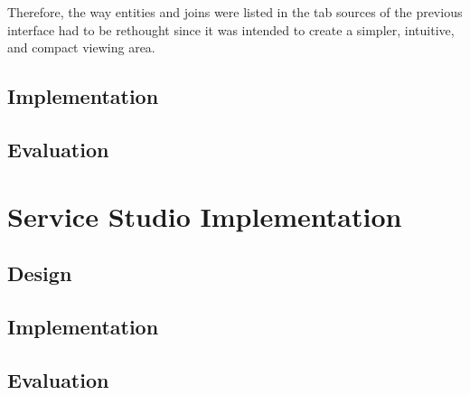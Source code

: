 Therefore, the way entities and joins were listed in the tab sources of the previous interface had to be rethought since it was intended to create a simpler, intuitive, and compact viewing area.




\subsection{Implementation}
\label{subsec:paper_prototype_implementation}

\subsection{Evaluation}
\label{subsec:paper_prototype_evaluation}


\section{Service Studio Implementation}
\label{sec:service_studio_implementation}

\subsection{Design}
\label{subsec:service_studio_design}

\subsection{Implementation}
\label{subsec:service_studio_implementation}

\subsection{Evaluation}
\label{subsec:service_studio_evaluation}

